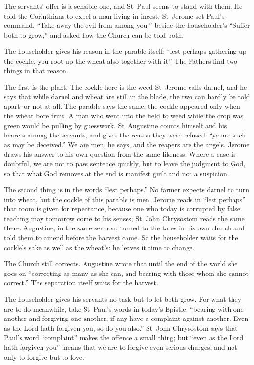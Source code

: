 The servants' offer is a sensible one, and St~Paul seems to stand with them.
He told the Corinthians to expel a man living in incest. St~Jerome set Paul's
command, ``Take away the evil from among you,'' beside the householder's
``Suffer both to grow,'' and asked how the Church can be told both.

The householder gives his reason in the parable itself: ``lest perhaps
gathering up the cockle, you root up the wheat also together with it.'' The
Fathers find two things in that reason.

The first is the plant. The cockle here is the weed St~Jerome calls darnel,
and he says that while darnel and wheat are still in the blade, the two can
hardly be told apart, or not at all. The parable says the same: the cockle
appeared only when the wheat bore fruit. A man who went into the field to
weed while the crop was green would be pulling by guesswork. St~Augustine
counts himself and his hearers among the servants, and gives the reason they
were refused: ``ye are such as may be deceived.'' We are men, he says, and the
reapers are the angels. Jerome draws his answer to his own question from the
same likeness. Where a case is doubtful, we are not to pass sentence quickly,
but to leave the judgment to God, so that what God removes at the end is
manifest guilt and not a suspicion.

The second thing is in the words ``lest perhaps.'' No farmer expects darnel to
turn into wheat, but the cockle of this parable is men. Jerome reads in
``lest perhaps'' that room is given for repentance, because one who today is
corrupted by false teaching may tomorrow come to his senses; St~John
Chrysostom reads the same there. Augustine, in the same sermon, turned to the
tares in his own church and told them to amend before the harvest came. So
the householder waits for the cockle's sake as well as the wheat's: he leaves
it time to change.

The Church still corrects. Augustine wrote that until the end of the world she
goes on ``correcting as many as she can, and bearing with those whom she
cannot correct.'' The separation itself waits for the harvest.

The householder gives his servants no task but to let both grow. For what
they are to do meanwhile, take St~Paul's words in today's Epistle: ``bearing
with one another and forgiving one another, if any have a complaint against
another. Even as the Lord hath forgiven you, so do you also.'' St~John
Chrysostom says that Paul's word ``complaint'' makes the offence a small
thing; but ``even as the Lord hath forgiven you'' means that we are to forgive
even serious charges, and not only to forgive but to love.


